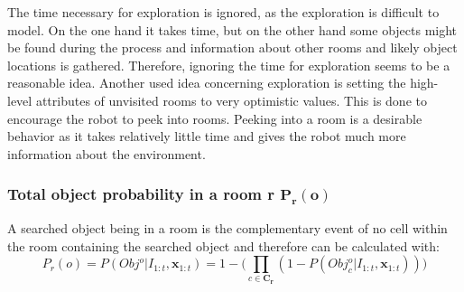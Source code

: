 The time necessary for exploration is ignored, as the exploration is difficult to model. On the one hand it takes time, but on the other hand some objects might be found during the process and information about other rooms and likely object locations is gathered. Therefore, ignoring the time for exploration seems to be a reasonable idea. Another used idea concerning exploration is setting the high-level attributes of unvisited rooms to very optimistic values. This is done to encourage the robot to peek into rooms. Peeking into a room is a desirable behavior as it takes relatively little time and gives the robot much more information about the environment. 

\subsubsection{Total object probability in a room r $\mathbf{P_r(o)}$}

A searched object being in a room is the complementary event of no cell within the room containing the searched object and therefore can be calculated with:
\begin{equation}
 P_r(o)=P(Obj^o|I_{1:t}, \mathbf{x}_{1:t})=1-\Big(\prod_{c \in \mathbf{C_r}} (1-P(Obj_{c}^{o}|I_{1:t}, \mathbf{x}_{1:t}))\Big) 
\end{equation} 

